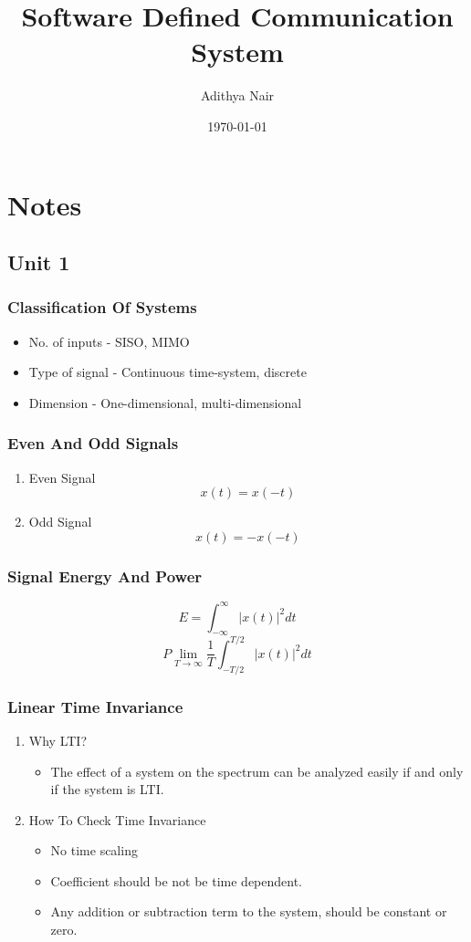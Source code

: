 \documentclass[11pt]{report}
\author{Adithya Nair}
\date{\today}
\title{Software Defined Communication System}
\begin{document}
\maketitle
\tableofcontents

\part{Notes}
\label{sec:orgc34de2d}
\chapter{Unit 1}
\label{sec:org7d2c385}
\section{Classification Of Systems}
\label{sec:org7e67950}
\begin{itemize}
\item No. of inputs - SISO, MIMO
\item Type of signal - Continuous time-system, discrete
\item Dimension - One-dimensional, multi-dimensional
\end{itemize}
\section{Even And Odd Signals}
\label{sec:org93dcdf3}
\begin{enumerate}
\item Even Signal
\label{sec:org69eba5d}
$$x(t) = x(-t)$$
\item Odd Signal
\label{sec:orgde50520}
$$x(t) = -x(-t)$$
\end{enumerate}
\section{Signal Energy And Power}
\label{sec:org29adfdf}
$$E = \int_{-\infty}^{\infty}|x(t)|^2dt$$
$$P \lim_{T \rightarrow \infty} \frac{1}{T} \int_{-T/2}^{T/2} |x(t)|^2dt$$
\section{Linear Time Invariance}
\label{sec:org972c01e}
\begin{enumerate}
\item Why LTI?
\label{sec:org924b53d}
\begin{itemize}
\item The effect of a system on the spectrum can be analyzed easily if and only if the system is LTI.
\end{itemize}
\item How To Check Time Invariance
\label{sec:orgc7bb8da}
\begin{itemize}
\item No time scaling
\item Coefficient should be not be time dependent.
\item Any addition or subtraction term to the system, should be constant or zero.
\end{itemize}
\end{enumerate}
\end{document}
